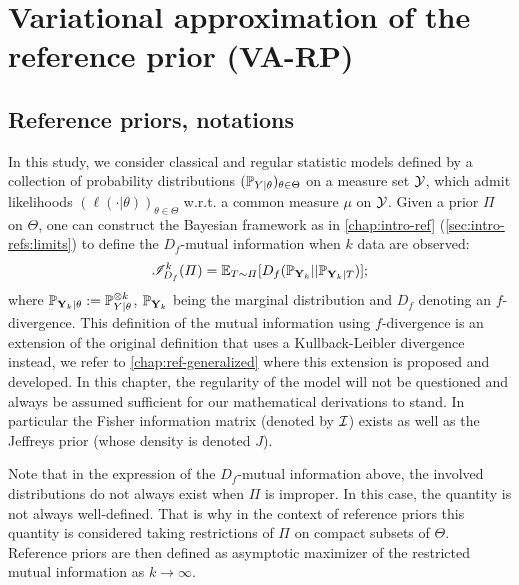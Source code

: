 \section{Variational approximation of the reference prior (VA-RP)}\label{sec:VARP:VARP}

\subsection{Reference priors, notations}\label{sec:VARP:refpriors}


In this study, we consider classical and regular statistic models defined by a collection of probability distributions $(\mathbb{P}_{Y|\theta})_{\theta\in\Theta}$ on a measure set $\mathcal{Y}$, which admit likelihoods $(\ell(\cdot|\theta))_{\theta\in\Theta}$ w.r.t. a common measure $\mu$ on $\mathcal{Y}$.
Given a prior $\varPi$ on $\Theta$, one can construct the Bayesian framework as in \cref{chap:intro-ref} (\cref{sec:intro-refs:limits}) to define the $D_f$-mutual information when $k$ data are observed:
    \begin{equation}\label{eq:VARP:IMalltheta}
        \mathscr{I}_{D_f}^k(\varPi) = \mathbb{E}_{T\sim\varPi}[D_f(\mathbb{P}_{\mathbf{Y}_k}||\mathbb{P}_{\mathbf{Y}_k|T} ) ];
    \end{equation}
where $\mathbb{P}_{\mathbf{Y}_k|\theta}:= \mathbb{P}_{Y|\theta}^{\otimes k} $, $\mathbb{P}_{\mathbf{Y}_k}$ being the marginal distribution and $D_f$ denoting an $f$-divergence.
This definition of the mutual information using $f$-divergence is an extension of the original definition that uses a Kullback-Leibler divergence instead, we refer to \cref{chap:ref-generalized} where this extension is proposed and developed.
In this chapter, the regularity of the model will not be questioned and always be assumed sufficient for our mathematical derivations to stand. In particular the Fisher information matrix (denoted by $\mathcal{I}$) exists as well as the Jeffreys prior (whose density is denoted $J$).


Note that in the expression of the $D_f$-mutual information above, the involved distributions 
do not always exist when $\varPi$ is improper. In this case, the quantity is not always well-defined. That is why in the context of reference priors this quantity is considered taking restrictions of $\varPi$ on compact subsets of $\Theta$. 
Reference priors are then defined as asymptotic maximizer of the restricted mutual information as $k\to\infty$.


